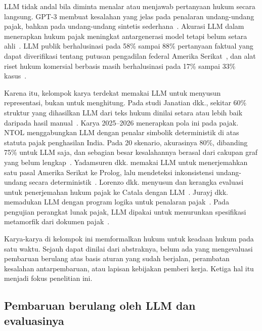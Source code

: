 LLM tidak andal bila diminta menalar atau menjawab pertanyaan hukum secara langsung. GPT-3 membuat kesalahan yang jelas pada penalaran undang-undang pajak, bahkan pada undang-undang sintetis sederhana~\cite{blairstanek2023gpt3}. Akurasi LLM dalam menerapkan hukum pajak meningkat antargenerasi model tetapi belum setara ahli~\cite{nay2024taxattorneys}. LLM publik berhalusinasi pada 58\% sampai 88\% pertanyaan faktual yang dapat diverifikasi tentang putusan pengadilan federal Amerika Serikat~\cite{dahl2024legalfictions}, dan alat riset hukum komersial berbasis  masih berhalusinasi pada 17\% sampai 33\% kasus~\cite{magesh2025hallucination}.

Karena itu, kelompok karya terdekat memakai LLM untuk menyusun representasi, bukan untuk menghitung. Pada studi Janatian dkk., sekitar 60\% struktur yang dihasilkan LLM dari teks hukum dinilai setara atau lebih baik daripada hasil manual~\cite{janatian2023texttostructure}. Karya 2025--2026 menerapkan pola ini pada pajak. NTOL menggabungkan LLM dengan penalar simbolik deterministik di atas  statuta pajak penghasilan India. Pada 20 skenario, akurasinya 80\%, dibanding 75\% untuk LLM saja, dan sebagian besar kesalahannya berasal dari cakupan graf yang belum lengkap~\cite{veeramani2026neurosymbolic}. Yadamsuren dkk. memakai LLM untuk menerjemahkan satu pasal  Amerika Serikat ke Prolog, lalu mendeteksi inkonsistensi undang-undang secara deterministik~\cite{yadamsuren2026formalization}. Lorenzo dkk. menyusun  dan kerangka evaluasi untuk penerjemahan hukum pajak ke Catala dengan LLM~\cite{lorenzo2025translating}. Jurayj dkk. memadukan LLM dengan program logika untuk penalaran pajak~\cite{jurayj2026tax}. Pada pengujian perangkat lunak pajak, LLM dipakai untuk menurunkan spesifikasi metamorfik dari dokumen pajak~\cite{srinivas2023fewshot,khiabani2026agentic}.

Karya-karya di kelompok ini memformalkan hukum untuk keadaan hukum pada satu waktu. Sejauh dapat dinilai dari abstraknya, belum ada yang mengevaluasi pembaruan berulang atas basis aturan yang sudah berjalan, perambatan kesalahan antarpembaruan, atau lapisan kebijakan pemberi kerja. Ketiga hal itu menjadi fokus penelitian ini.

\subsection{Pembaruan berulang oleh LLM dan evaluasinya}
\label{subsec:pembaruan-llm}

